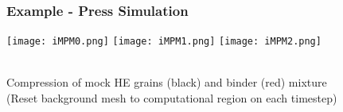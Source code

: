 \documentclass{beamer}
\begin{document}

\begin{frame}
\begin{center}
\frametitle{Example - Press Simulation}

\texttt{[image: iMPM0.png]}
\texttt{[image: iMPM1.png]}
\texttt{[image: iMPM2.png]}

~\\

Compression of mock HE grains (black) and binder (red) mixture\\

(Reset background mesh to computational region on each timestep)

\end{center}
\end{frame}

\end{document}

